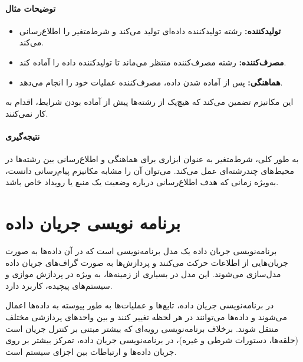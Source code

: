 \documentclass[12pt, a4paper]{report}
\begin{document}
\subsubsection{توضیحات مثال}
\begin{itemize}
	\item \textbf{تولیدکننده:} رشته تولیدکننده داده‌ای تولید می‌کند و شرط‌متغیر را اطلاع‌رسانی می‌کند.
	\item \textbf{مصرف‌کننده:} رشته مصرف‌کننده منتظر می‌ماند تا تولیدکننده داده را آماده کند.
	\item \textbf{هماهنگی:} پس از آماده شدن داده، مصرف‌کننده عملیات خود را انجام می‌دهد.
\end{itemize}

این مکانیزم تضمین می‌کند که هیچ‌یک از رشته‌ها پیش از آماده بودن شرایط، اقدام به کار نمی‌کنند.

\subsubsection{نتیجه‌گیری}
به طور کلی، شرط‌متغیر به عنوان ابزاری برای هماهنگی و اطلاع‌رسانی بین رشته‌ها در محیط‌های چندرشته‌ای عمل می‌کند. می‌توان آن را مشابه مکانیزم پیام‌رسانی دانست، به‌ویژه زمانی که هدف اطلاع‌رسانی درباره وضعیت یک منبع یا رویداد خاص باشد.

\chapter{برنامه نویسی جریان داده}

برنامه‌نویسی جریان داده یک مدل برنامه‌نویسی است که در آن داده‌ها به صورت جریان‌هایی از اطلاعات حرکت می‌کنند و پردازش‌ها به صورت گراف‌های جریان داده مدل‌سازی می‌شوند. این مدل در بسیاری از زمینه‌ها، به ویژه در پردازش موازی و سیستم‌های پیچیده، کاربرد دارد.

در برنامه‌نویسی جریان داده، تابع‌ها و عملیات‌ها به طور پیوسته به داده‌ها اعمال می‌شوند و داده‌ها می‌توانند در هر لحظه تغییر کنند و بین واحدهای پردازشی مختلف منتقل شوند. برخلاف برنامه‌نویسی رویه‌ای که بیشتر مبتنی بر کنترل جریان است (حلقه‌ها، دستورات شرطی و غیره)، در برنامه‌نویسی جریان داده، تمرکز بیشتر بر روی جریان داده‌ها و ارتباطات بین اجزای سیستم است.
\end{document}
